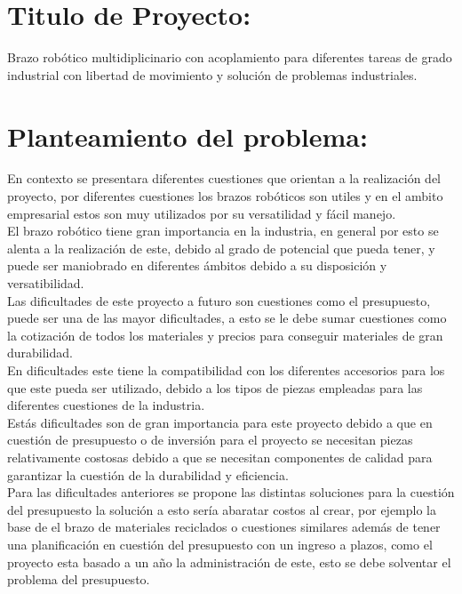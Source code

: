 \documentclass[14pt,a4paper]{article}
\begin{document}
\newpage

\section{Titulo de Proyecto:}

Brazo robótico multidiplicinario con acoplamiento para diferentes tareas de grado industrial con libertad de movimiento y solución de problemas industriales.


\section{Planteamiento del problema:}

En contexto se presentara diferentes cuestiones que orientan a la realización del proyecto, por diferentes cuestiones los brazos robóticos son utiles y en el ambito empresarial estos son muy utilizados por su versatilidad y fácil manejo.\\
El brazo robótico tiene gran importancia en la industria, en general por esto se alenta a la realización de este, debido al grado de potencial que pueda tener, y puede ser maniobrado en diferentes ámbitos debido a su disposición y versatibilidad.\\
Las dificultades de este proyecto a futuro son cuestiones como el presupuesto, puede ser una de las mayor dificultades, a esto se le debe sumar cuestiones como la cotización de todos los materiales y precios para conseguir materiales de gran durabilidad.\\
En dificultades este tiene la compatibilidad con los diferentes accesorios para los que este pueda ser utilizado,  debido a los tipos de piezas empleadas para las diferentes cuestiones de la industria.\\
Estás dificultades son de gran importancia para este proyecto debido a que en cuestión de presupuesto o de inversión para el proyecto se necesitan piezas relativamente costosas debido a que se necesitan componentes de calidad para garantizar la cuestión de la durabilidad y eficiencia.\\
Para las dificultades anteriores se propone las distintas soluciones para la cuestión del presupuesto la solución a esto sería abaratar costos al crear, por ejemplo la base de el brazo de materiales reciclados o cuestiones similares además de tener una planificación en cuestión del presupuesto con un ingreso a plazos, como el proyecto esta basado a un año la administración de este, esto se debe solventar el problema del presupuesto.\\
\end{document}
